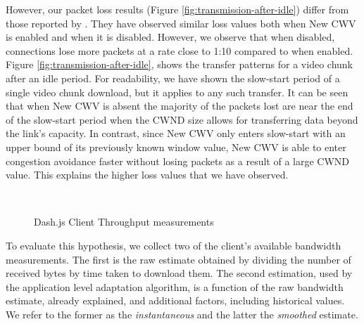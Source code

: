 \documentclass[10pt,sigconf,anonymous]{acmart}
\begin{document}
However, our packet loss results (Figure \ref{fig:transmission-after-idle}) differ from those reported by \cite{Nazir-2014-performance-evaluation-congestion-window-validation-dash-newcwv}. They have observed similar loss values both when New CWV is enabled and when it is disabled. However, we observe that when disabled, connections lose more packets at a rate close to 1:10 compared to when enabled. Figure \ref{fig:transmission-after-idle}, shows the transfer patterns for a video chunk after an idle period. For readability, we have shown the slow-start period of a single video chunk download, but it applies to any such transfer. It can be seen that when New CWV is absent the majority of the packets lost are near the end of the slow-start period when the CWND size allows for transferring data beyond the link's capacity. In contrast, since New CWV only enters slow-start with an upper bound of its previously known window value, New CWV is able to enter congestion avoidance faster without losing packets as a result of a large CWND value. This explains the higher loss values that we have observed.


  \begin{figure}
    \centering
    \\
    \caption{Dash.js Client Throughput measurements}
    \label{fig:throughput-clients}
  \end{figure}

To evaluate this hypothesis, we collect two of the client's available bandwidth measurements. The first is the raw estimate obtained by dividing the number of received bytes by time taken to download them. The second estimation, used by the application level adaptation algorithm, is a function of the raw bandwidth estimate, already explained, and additional factors, including historical values. We refer to the former as the \emph{instantaneous} and the latter the \emph{smoothed} estimate.
\end{document}
